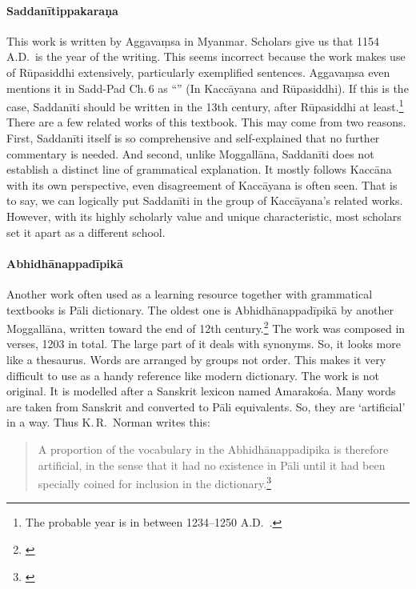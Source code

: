 \paragraph*{Saddan\=itippakara\d na} This work is written by Aggava\d msa in Myanmar. Scholars give us that 1154 A.D.\ is the year of the writing. This seems incorrect because the work makes use of R\=upasiddhi extensively, particularly exemplified sentences. Aggava\d msa even mentions it in Sadd-Pad Ch.\,6 as ``'' (In Kacc\=ayana and R\=upasiddhi). If this is the case, Saddan\=iti should be written in the 13th century, after R\=upasiddhi at least.\footnote{The probable year is in between 1234--1250 A.D.\ \citep[see][p.~23]{supaphan:pali}.} There are a few related works of this textbook. This may come from two reasons. First, Saddan\=iti itself is so comprehensive and self-explained that no further commentary is needed. And second, unlike Moggall\=ana, Saddan\=iti does not establish a distinct line of grammatical explanation. It mostly follows Kacc\=ana with its own perspective, even disagreement of Kacc\=ayana is often seen. That is to say, we can logically put Saddan\=iti in the group of Kacc\=ayana's related works. However, with its highly scholarly value and unique characteristic, most scholars set it apart as a different school.

\paragraph*{Abhidh\=anappad\=ipik\=a} Another work often used as a learning resource together with grammatical textbooks is P\=ali dictionary. The oldest one is Abhidh\=anappad\=ipik\=a by another Moggall\=ana, written toward the end of 12th century.\footnote{\citealp[p.~56]{geiger:literature}} The work was composed in verses, 1203 in total. The large part of it deals with synonyms. So, it looks more like a thesaurus. Words are arranged by groups not order. This makes it very difficult to use as a handy reference like modern dictionary. The work is not original. It is modelled after a Sanskrit lexicon named Amarako\'sa. Many words are taken from Sanskrit and converted to P\=ali equivalents. So, they are `artificial' in a way. Thus K.\,R.\ Norman writes this:

\begin{quote}
A proportion of the vocabulary in the Abhidh\=anappadipika is therefore artificial, in the sense that it had no existence in P\=ali until it had been specially coined for inclusion in the dictionary.\footnote{\citealp[p.~167]{norman:literature}}
\end{quote}

